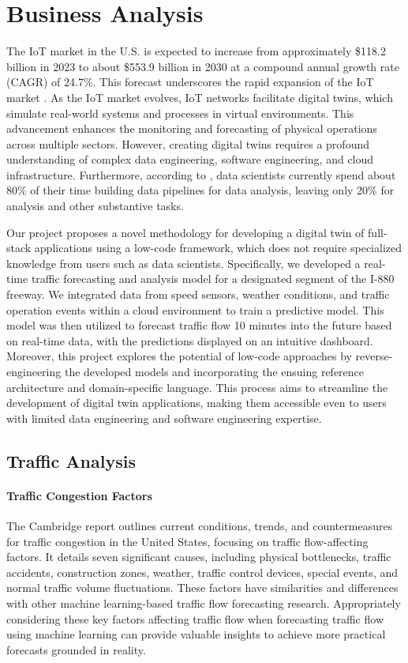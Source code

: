\chapter{Business Analysis}

The IoT market in the U.S. is expected to increase from approximately \$118.2 billion in 2023 to about \$553.9 billion in 2030 at a compound annual growth rate (CAGR) of 24.7\%. This forecast underscores the rapid expansion of the IoT market \citet{fortune2020us}. As the IoT market evolves, IoT networks facilitate digital twins, which simulate real-world systems and processes in virtual environments. This advancement enhances the monitoring and forecasting of physical operations across multiple sectors. However, creating digital twins requires a profound understanding of complex data engineering, software engineering, and cloud infrastructure. Furthermore, according to \citet{trotino2021building}, data scientists currently spend about 80\% of their time building data pipelines for data analysis, leaving only 20\% for analysis and other substantive tasks. 

Our project proposes a novel methodology for developing a digital twin of full-stack applications using a low-code framework, which does not require specialized knowledge from users such as data scientists. 
Specifically, we developed a real-time traffic forecasting and analysis model for a designated segment of the I-880 freeway. We integrated data from speed sensors, weather conditions, and traffic operation events within a cloud environment to train a predictive model. This model was then utilized to forecast traffic flow 10 minutes into the future based on real-time data, with the predictions displayed on an intuitive dashboard. Moreover, this project explores the potential of low-code approaches by reverse-engineering the developed models and incorporating the ensuing reference architecture and domain-specific language. This process aims to streamline the development of digital twin applications, making them accessible even to users with limited data engineering and software engineering expertise.

\newpage

\section{Traffic Analysis}
\subsubsection{Traffic Congestion Factors}
The Cambridge \citet{systematics2005traffic} report outlines current conditions, trends, and countermeasures for traffic congestion in the United States, focusing on traffic flow-affecting factors. It details seven significant causes, including physical bottlenecks, traffic accidents, construction zones, weather, traffic control devices, special events, and normal traffic volume fluctuations. These factors have similarities and differences with other machine learning-based traffic flow forecasting research. Appropriately considering these key factors affecting traffic flow when forecasting traffic flow using machine learning can provide valuable insights to achieve more practical forecasts grounded in reality.

